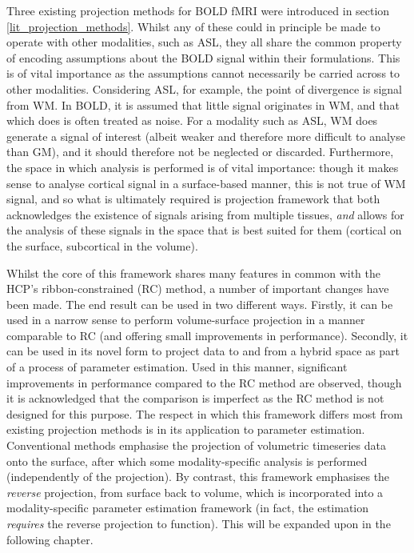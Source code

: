 Three existing projection methods for BOLD fMRI were introduced in section \ref{lit_projection_methods}. Whilst any of these could in principle be made to operate with other modalities, such as ASL, they all share the common property of encoding assumptions about the BOLD signal within their formulations. This is of vital importance as the assumptions cannot necessarily be carried across to other modalities. Considering ASL, for example, the point of divergence is signal from WM. In BOLD, it is assumed that little signal originates in WM, and that which does is often treated as noise. For a modality such as ASL, WM does generate a signal of interest (albeit weaker and therefore more difficult to analyse than GM), and it should therefore not be neglected or discarded. Furthermore, the space in which analysis is performed is of vital importance: though it  makes sense to analyse cortical signal in a surface-based manner, this is not true of WM signal, and so what is ultimately required is projection framework that both acknowledges the existence of signals arising from multiple tissues, \textit{and} allows for the analysis of these signals in the space that is best suited for them (cortical on the surface, subcortical in the volume).  

Whilst the core of this framework shares many features in common with the HCP's ribbon-constrained (RC) method, a number of important changes have been made. The end result can be used in two different ways. Firstly, it can be used in a narrow sense to perform volume-surface projection in a manner comparable to RC (and offering small improvements in performance). Secondly, it can be used in its novel form to project data to and from a hybrid space as part of a process of parameter estimation. Used in this manner, significant improvements in performance compared to the RC method are observed, though it is acknowledged that the comparison is imperfect as the RC method is not designed for this purpose. The respect in which this framework differs most from existing projection methods is in its application to parameter estimation. Conventional methods emphasise the projection of volumetric timeseries data onto the surface, after which some modality-specific analysis is performed (independently of the projection). By contrast, this framework emphasises the \textit{reverse} projection, from surface back to volume, which is incorporated into a modality-specific parameter estimation framework (in fact, the estimation \textit{requires} the reverse projection to function). This will be expanded upon in the following chapter. 


